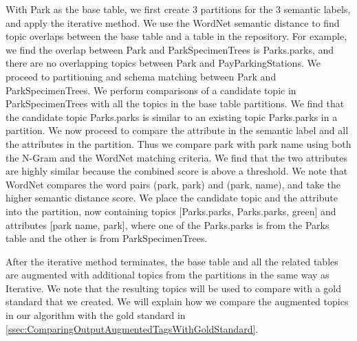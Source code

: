 With Park as the base table, we first create 3 partitions for the 3 semantic labels, and apply the iterative method. We use the WordNet semantic distance to find topic overlaps between the base table and a table in the repository. For example, we find the overlap between Park and ParkSpecimenTrees is Parks.parks, and there are no overlapping topics between Park and PayParkingStations. We proceed to partitioning and schema matching between Park and ParkSpecimenTrees. We perform comparisons of a candidate topic in ParkSpecimenTrees with all the topics in the base table partitions. We find that the candidate topic Parks.parks is similar to an existing topic Parks.parks in a partition. We now proceed to compare the attribute in the semantic label and all the attributes in the partition. Thus we compare park with park name using both the N-Gram and the WordNet matching criteria. We find that the two attributes are highly similar because the combined score is above a threshold. We note that WordNet compares the word pairs (park, park) and (park, name), and take the higher semantic distance score. We place the candidate topic and the attribute into the partition, now containing topics [Parks.parks, Parks.parks, green] and attributes [park name, park], where one of the Parks.parks is from the Parks table and the other is from ParkSpecimenTrees.

After the iterative method terminates, the base table and all the related tables are augmented with additional topics from the partitions in the same way as Iterative. We note that the resulting topics will be used to compare with a gold standard that we created. We will explain how we compare the augmented topics in our algorithm with the gold standard in \autoref{ssec:ComparingOutputAugmentedTagsWithGoldStandard}.

